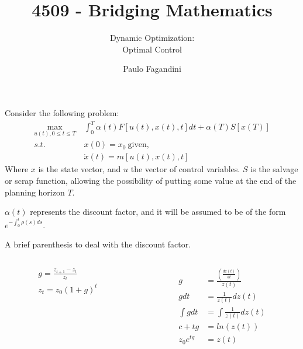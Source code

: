\documentclass[aspectratio=169]{beamer}
\title[]{4509 - Bridging Mathematics}
\subtitle{Dynamic Optimization:\\Optimal Control}
\author[P. Fagandini]{Paulo Fagandini}
\institute{}
\date{}
\begin{document}
\begin{frame}

Consider the following problem:
\begin{align*}
    \max_{u(t),0\leq t\leq T}\ &\int_0^T \alpha(t) F[u(t),x(t),t]dt + \alpha(T)S[x(T)]\\
    s.t.\ &x(0)=x_0\ \text{given},\\
    &\dot{x}(t)=m[u(t),x(t),t]
\end{align*}
Where $x$ is the state vector, and $u$ the vector of control variables. $S$ is the salvage or scrap function, allowing the possibility of putting some value at the end of the planning horizon $T$.\par

$\alpha(t)$ represents the discount factor, and it will be assumed to be of the form $e^{-\int_0^t \rho(s)ds}$.
    
\end{frame}

\begin{frame}
    A brief parenthesis to deal with the discount factor.
    \begin{columns}
        \begin{column}{0.47\textwidth}
            \begin{align*}
                g = \frac{z_{t+1}-z_t}{z_t}\\
                z_t = z_0(1+g)^t\
            \end{align*}
        \end{column}
        \pause
        \begin{column}{0.47\textwidth}
            \begin{align*}
                g &= \frac{\left(\frac{d z(t)}{dt}\right)}{z(t)}\\
                g dt &= \frac{1}{z(t)}dz(t)\\
                \int g dt &= \int \frac{1}{z(t)}dz(t)\\
                c+tg &= ln(z(t))\\
                z_0e^{tg} &= z(t)
            \end{align*}
        \end{column}
    \end{columns}
    \vspace{0.5cm}
    \begin{columns}
        \begin{column}{0.47\textwidth}
        \end{column}
        \begin{column}{0.47\textwidth}
        \end{column}
    \end{columns}
    
\end{frame}
\end{document}
